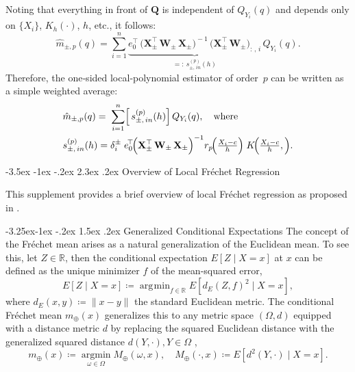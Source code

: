 \documentclass[12pt]{article}
\makeatletter
\renewcommand\section{\@startsection{section}{1}{\z@}%
  {-3.5ex \@plus -1ex \@minus -.2ex}%
  {2.3ex \@plus.2ex}%
  {\bfseries\large\center}} %
\renewcommand\subsection{\@startsection{subsection}{2}{\z@}%
  {-3.25ex\@plus -1ex \@minus -.2ex}%
  {1.5ex \@plus .2ex}%
  {\itshape\large\center}} %
\DeclareMathOperator*{\argmin}{\arg\!\min}
\makeatother
\begin{document}
Noting that everything in front of $\mathbf{Q}$ is independent of $Q_{Y_i}(q)$
and depends only on $\{X_i\}$, $K_h(\cdot)$, $h$, etc., it follows:
\[
  \hat{m}_{\pm,p}(q)
  =
  \sum_{i=1}^{n}
    \underbrace{
      e_{0}^{\!\top}
      \,\bigl(        \mathbf{X}_{\pm}^\top\,\mathbf{W}_{\pm}\,\mathbf{X}_{\pm}
      \bigr)^{\!-1}
      \,\bigl(
        \mathbf{X}_{\pm}^\top\,\mathbf{W}_{\pm}
      \bigr)_{:\,,\,i}
    }_{=:~s_{\pm,\,i n}^{(p)}(h)}
    \, Q_{Y_i}(q).
\]
Therefore, the one‐sided local‐polynomial estimator of order~\(p\) can be
written as a simple weighted average:
\begin{align*}
 &  \hat{m}_{\pm,p}(q)
  =
  \;\sum_{i=1}^n
    \Bigl[
      \,s_{\pm,\,i n}^{(p)}(h)
    \Bigr]\,
    Q_{Y_i}(q),
  \quad\text{where} \\
  & 
  s_{\pm,\,i n}^{(p)}(h)
  =
  \delta_i^\pm\;
  e_0^{\!\top}\!
\Bigl(\mathbf{X}_{\pm}^\top\,\mathbf{W}_{\pm}\,\mathbf{X}_{\pm}\Bigr)^{-1}
  r_{p}\!\Bigl(\tfrac{X_i - c}{h}\Bigr)\;K\!\Bigl(\tfrac{X_i - c}{h},\Bigr).
\end{align*}


\section{Overview of Local Fr\'echet Regression} \label{app:frechet}

This supplement provides a brief overview of local Fr\'echet regression as proposed in \citet{petersen2019frechet}. 

\subsection{Generalized Conditional Expectations}
The concept of the Fr\'echet mean arises as a natural generalization of the Euclidean mean. To see this, let $Z \in \mathbb{R}$, then the conditional expectation $E[Z \mid X=x]$ at $x$ can be defined as the unique minimizer $f$ of the mean-squared error,
\[
E[Z \mid X=x] \coloneqq \argmin_{f \in \mathbb{R}} E[ d_E\left(Z,f  \right)^2 \mid X=x],
\]
where $d_E(x,y) \coloneqq \| x - y\|$ the standard Euclidean metric. The conditional Fr\'echet mean $m_{\oplus}(x)$ generalizes this to any metric space $(\Omega, d)$ equipped with a distance metric $d$ by replacing the squared Euclidean distance with the generalized squared distance $d(Y,\cdot), Y \in \Omega$ \citep{petersen2019frechet}, 
\begin{equation} \label{eq:conditional_frechet_mean}
m_{\oplus}(x)\coloneqq \underset{\omega \in \Omega}{\operatorname{argmin}} M_{\oplus}(\omega, x), \quad M_{\oplus}(\cdot, x) \coloneqq E\left[d^2(Y, \cdot) \mid X=x\right].
\end{equation}
\end{document}
